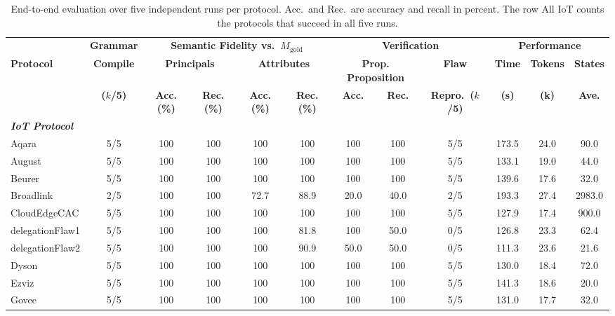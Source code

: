 \begin{table}[t]
  \centering
  \scriptsize
  \setlength{\tabcolsep}{0pt}
  \caption{End-to-end evaluation over five independent runs per protocol. Acc.\ and Rec.\ are accuracy and recall in percent. The row All IoT counts the protocols that succeed in all five runs.}
  \label{tab:pilot_eval_matrix}
  \begin{tabular*}{\linewidth}{@{\extracolsep{\fill}} l c cccc cc c ccc @{}}
  \hline\hline
  \rule{0pt}{2.5ex} & \textbf{Grammar} & \multicolumn{4}{c}{\textbf{Semantic Fidelity vs.\ $M_{\mathrm{gold}}$}} & \multicolumn{3}{c}{\textbf{Verification}} & \multicolumn{3}{c}{\textbf{Performance}} \\
  \cline{2-2} \cline{3-6} \cline{7-9} \cline{10-12}
  \rule{0pt}{2.3ex}\textbf{Protocol} & \textbf{Compile} & \multicolumn{2}{c}{\textbf{Principals}} & \multicolumn{2}{c}{\textbf{Attributes}} & \multicolumn{2}{c}{\textbf{Prop. Proposition}} & \textbf{Flaw} & \textbf{Time} & \textbf{Tokens} & \textbf{States} \\
   & \textbf{($k$/5)} & \textbf{Acc. (\%)} & \textbf{Rec. (\%)} & \textbf{Acc. (\%)} & \textbf{Rec. (\%)} & \textbf{Acc.} & \textbf{Rec.} & \textbf{Repro.\ ($k$/5)} & \textbf{(s)} & \textbf{(k)} & \textbf{Ave.} \\
  \hline
  \multicolumn{12}{l}{\rule{0pt}{2.5ex}\textit{\textbf{IoT Protocol}}} \\
  \hline
  Aqara & 5/5 & 100 & 100 & 100 & 100 & 100 & 100 & 5/5 & 173.5 & 24.0 & 90.0 \\
  August & 5/5 & 100 & 100 & 100 & 100 & 100 & 100 & 5/5 & 133.1 & 19.0 & 44.0 \\
  Beurer & 5/5 & 100 & 100 & 100 & 100 & 100 & 100 & 5/5 & 139.6 & 17.6 & 32.0 \\
  Broadlink & 2/5 & 100 & 100 & 72.7 & 88.9 & 20.0 & 40.0 & 2/5 & 193.3 & 27.4 & 2983.0 \\
  CloudEdgeCAC & 5/5 & 100 & 100 & 100 & 100 & 100 & 100 & 5/5 & 127.9 & 17.4 & 900.0 \\
  delegationFlaw1 & 5/5 & 100 & 100 & 100 & 81.8 & 100 & 50.0 & 0/5 & 126.8 & 23.3 & 62.4 \\
  delegationFlaw2 & 5/5 & 100 & 100 & 100 & 90.9 & 50.0 & 50.0 & 0/5 & 111.3 & 23.6 & 21.6 \\
  Dyson & 5/5 & 100 & 100 & 100 & 100 & 100 & 100 & 5/5 & 130.0 & 18.4 & 72.0 \\
  Ezviz & 5/5 & 100 & 100 & 100 & 100 & 100 & 100 & 5/5 & 141.3 & 18.6 & 20.0 \\
  Govee & 5/5 & 100 & 100 & 100 & 100 & 100 & 100 & 5/5 & 131.0 & 17.7 & 32.0 \\

\end{tabular*}
\end{table}

